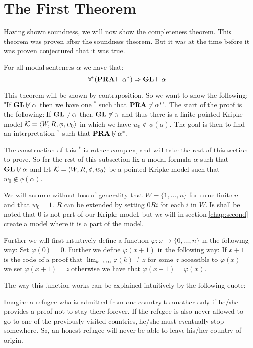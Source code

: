 \documentclass[../main.tex]{subfiles}
\begin{document}
\section{The First Theorem}
Having shown soundness, we will now show the completeness theorem. This theorem
was proven after the soundness theorem. But it was at the time before it was
proven conjectured that it was true. 

\begin{thm}
	For all modal sentences $\alpha$ we have that:
	\[\forall ^* (\text{\textbf{PRA}}\vdash \alpha^*)\Rightarrow \text{\textbf{GL}}\vdash \alpha\]
\end{thm}

This theorem will be shown by contraposition. So we want to show the following:
"If $\text{\textbf{GL}}\not\vdash \alpha$ then we
have one $^*$ such that $\text{\textbf{PRA}}\not\vdash\alpha^*$". 
The start of the proof is the following: If $\text{\textbf{GL}}\not\vdash\alpha$ then
$\text{\textbf{GL}}\not\vDash\alpha$ and thus there is a finite pointed Kripke model $\mathcal{K}=\langle
W,R,\phi,w_0\rangle$ in which we have $w_0\not\in\phi(\alpha)$. The goal is then to
find an interpretation $^*$ such that $\text{\textbf{PRA}}\not\vdash\alpha^*$.

The construction of this
$^*$ is rather complex, and will take the rest of this section to prove. So for the
rest of this subsection fix a modal formula $\alpha$ such that $\text{\textbf{GL}}\not\vdash
\alpha$
and let $\mathcal{K}=\langle W,R,\phi,w_0\rangle$ be a pointed Kripke model such that
$w_0\not\in\phi(\alpha)$.

We will assume without loss of generality  that $W=\{1,\ldots, n\}$ for some finite $n$ and that $w_0=1$.
$R$ can be extended by setting $0Ri$ for each $i$ in $W$. Is shall be noted
that $0$ is not part of our Kripke model, but we will in section
\ref{chap:second} create a model where it is a part of the model.

Further we will first intuitively define a function $\varphi:\omega\rightarrow\{0,\ldots, n\}$ in the
following way: Set $\varphi(0)=0$. Further we define $\varphi(x+1)$ in the following way:
If $x+1$ is the code of a proof that $\lim_{k\rightarrow\infty}\varphi(k)\not =z$ for
some $z$ accessible to $\varphi(x)$ we set $\varphi(x+1)=z$ otherwise we have that
$\varphi(x+1)=\varphi(x)$.

The way this function works can be explained intuitively by the following
quote:
\begin{displayquote}
	Imagine a refugee who is admitted from one country to another only if
	he/she provides a proof not to stay there forever. If the refugee is
	also never allowed to go to one of the previously visited countries,
	he/she must eventually stop somewhere. So, an honest refugee will never
	be able to leave his/her country of origin. \parencite{ArteBe}
\end{displayquote}
\end{document}
